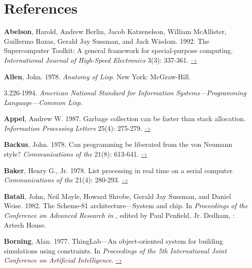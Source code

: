 \chapter*{References}
\label{References}

{\footnotesize

 \label{Abelson et al. 1992}
\textbf{Abelson}, Harold, Andrew Berlin, Jacob Katzenelson, William
McAllister,
Guillermo Rozas, Gerald Jay Sussman, and Jack Wisdom. 1992.  The Supercomputer
Toolkit: A general framework for special-purpose computing.
\textit{International Journal of High-Speed Electronics} 3(3): 337-361.
\href{http://www.hpl.hp.com/techreports/94/HPL-94-30.html}{–›}

 \label{Allen 1978}
\textbf{Allen}, John.  1978.  \textit{Anatomy of Lisp}. New York: McGraw-Hill.

 \label{ANSI 1994}
 3.226-1994. \textit{American
  National Standard for Information
Sys\-tems---Programming Language---Common Lisp}.

 \label{Appel 1987}
\textbf{Appel}, Andrew W.  1987.  Garbage collection can be faster than stack
allocation.  \textit{Information Processing Letters} 25(4): 275-279.
\href{https://www.cs.princeton.edu/~appel/papers/45.ps}{–›}

 \label{Backus 1978}
\textbf{Backus}, John.  1978.  Can programming be liberated from
the von Neumann style?
\textit{Communications of the } 21(8): 613-641.
\href{http://worrydream.com/refs/Backus-CanProgrammingBeLiberated.pdf}{–›}

 \label{Baker (1978)}
\textbf{Baker}, Henry G., Jr.  1978.  List processing in real time
on a serial computer.
\textit{Communications of the } 21(4): 280-293.
\href{http://dspace.mit.edu/handle/1721.1/41976}{–›}

 \label{Batali et al. 1982}
\textbf{Batali}, John, Neil Mayle, Howard Shrobe, Gerald Jay
Sussman, and Daniel Weise.
1982.  The Scheme-81 architecture---System and chip.  In
\textit{Proceedings of
  the  Conference on Advanced Research in
}, edited by
Paul Penfield, Jr. Dedham, : Artech House.

 \label{Borning (1977)}
\textbf{Borning}, Alan.  1977.  ThingLab---An object-oriented
system for building
simulations using constraints. In \textit{Proceedings of the 5th International
Joint Conference on Artificial Intelligence}.
\href{http://ijcai.org/Past\%20Proceedings/IJCAI-77-VOL1/PDF/085.pdf}{–›}

}
